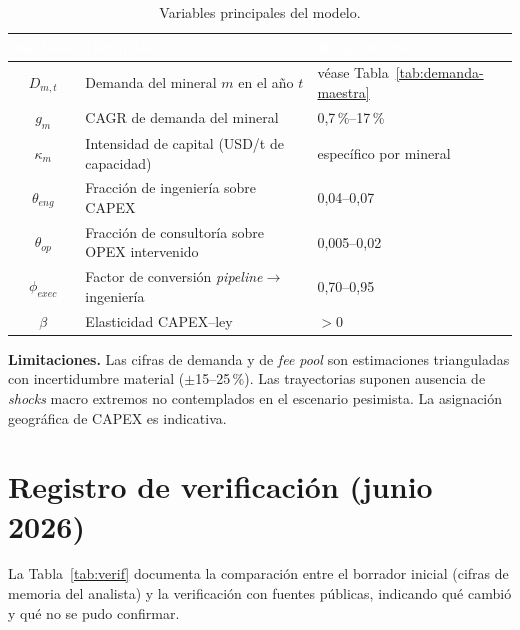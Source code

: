 \documentclass[11pt,letterpaper]{report}
\begin{document}
\begin{table}[htbp]
\centering
\caption{Variables principales del modelo.}
\label{tab:variables}
\footnotesize
\renewcommand{\arraystretch}{1.25}
\begin{tabularx}{\textwidth}{@{}clX@{}}
\toprule
\rowcolor{tablehead}\textcolor{white}{\textbf{Símbolo}} & \textcolor{white}{\textbf{Definición}} & \textcolor{white}{\textbf{Rango usado}}\\
\midrule
$D_{m,t}$ & Demanda del mineral $m$ en el año $t$ & véase Tabla~\ref{tab:demanda-maestra}\\
\rowcolor{tablealt}$g_m$ & CAGR de demanda del mineral & 0{,}7\,\%--17\,\%\\
$\kappa_m$ & Intensidad de capital (USD/t de capacidad) & específico por mineral\\
\rowcolor{tablealt}$\theta_{eng}$ & Fracción de ingeniería sobre CAPEX & 0{,}04--0{,}07\\
$\theta_{op}$ & Fracción de consultoría sobre OPEX intervenido & 0{,}005--0{,}02\\
\rowcolor{tablealt}$\phi_{exec}$ & Factor de conversión \emph{pipeline}$\rightarrow$ingeniería & 0{,}70--0{,}95\\
$\beta$ & Elasticidad CAPEX--ley & $>0$\\
\bottomrule
\end{tabularx}
\end{table}

\textbf{Limitaciones.} Las cifras de demanda y de \emph{fee pool} son estimaciones trianguladas con incertidumbre material
($\pm$15--25\,\%). Las trayectorias suponen ausencia de \emph{shocks} macro extremos no contemplados en el escenario pesimista. La
asignación geográfica de CAPEX es indicativa.

\section{Registro de verificación (junio 2026)}
La Tabla~\ref{tab:verif} documenta la comparación entre el borrador inicial (cifras de memoria del analista) y la verificación con
fuentes públicas, indicando qué cambió y qué no se pudo confirmar.
\end{document}
